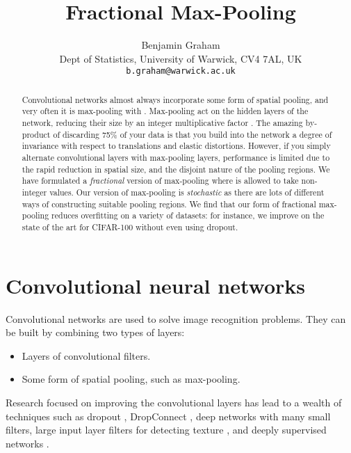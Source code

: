 \documentclass[english]{article}
\begin{document}
\title{Fractional Max-Pooling}

\author{
Benjamin Graham\\
{\small Dept of Statistics, University of Warwick, CV4 7AL, UK}\\
{\small \tt b.graham@warwick.ac.uk}\\
}
\maketitle
\begin{abstract}
Convolutional networks almost always incorporate some form of spatial
pooling, and very often it is  max-pooling with
. Max-pooling act on the hidden layers of the network,
reducing their size by an integer multiplicative factor .
The amazing by-product of discarding 75\% of your data is that you
build into the network a degree of invariance with respect to translations
and elastic distortions. However, if you simply alternate convolutional
layers with max-pooling layers, performance is limited due to the
rapid reduction in spatial size, and the disjoint nature of the pooling
regions. We have formulated a \emph{fractional} version of max-pooling
where  is allowed to take non-integer values. Our version
of max-pooling is \emph{stochastic} as there are lots of different
ways of constructing suitable pooling regions. We find that our form
of fractional max-pooling reduces overfitting on a variety of datasets:
for instance, we improve on the state of the art for CIFAR-100 without
even using dropout.
\end{abstract}

\section{Convolutional neural networks}

Convolutional networks are used to solve image recognition problems.
They can be built by combining two types of layers:
\begin{itemize}
\item Layers of convolutional filters.
\item Some form of spatial pooling, such as max-pooling.
\end{itemize}
Research focused on improving the convolutional layers has lead to
a wealth of techniques such as dropout \cite{dropout}, DropConnect
\cite{DropConnect}, deep networks with many small filters\cite{multicolumndeep},
large input layer filters for detecting texture \cite{conf/nips/KrizhevskySH12},
and deeply supervised networks \cite{DeeplySupervisedNets}.
\end{document}
